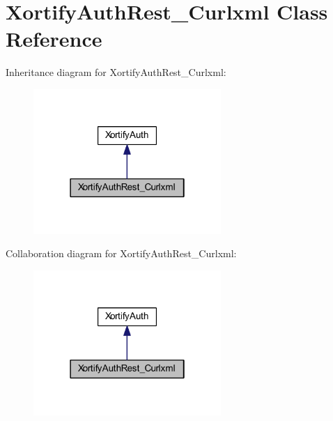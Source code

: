 \hypertarget{class_xortify_auth_rest___curlxml}{\section{Xortify\-Auth\-Rest\-\_\-\-Curlxml Class Reference}
\label{class_xortify_auth_rest___curlxml}
}


Inheritance diagram for Xortify\-Auth\-Rest\-\_\-\-Curlxml\-:
\nopagebreak
\begin{figure}[H]
\begin{center}
\leavevmode
\includegraphics[width=202pt]{class_xortify_auth_rest___curlxml__inherit__graph}
\end{center}
\end{figure}


Collaboration diagram for Xortify\-Auth\-Rest\-\_\-\-Curlxml\-:
\nopagebreak
\begin{figure}[H]
\begin{center}
\leavevmode
\includegraphics[width=202pt]{class_xortify_auth_rest___curlxml__coll__graph}
\end{center}
\end{figure}
